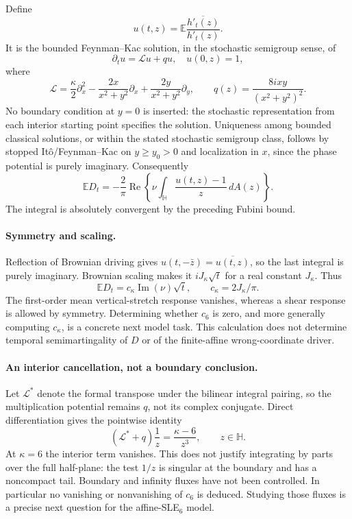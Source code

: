\documentclass[11pt]{article}
\theoremstyle{definition}\newtheorem{definition}[theorem]{Definition}
\theoremstyle{remark}\newtheorem{remark}[theorem]{Remark}
\begin{document}
Define
\[
 u(t,z)=\mathbb E\frac{\overline{h'_t(z)}}{h'_t(z)}.
\]
It is the bounded Feynman--Kac solution, in the stochastic semigroup
sense, of
\[
 \partial_tu=\mathcal Lu+qu,\quad u(0,z)=1,
\]
where
\[
 \mathcal L=\frac\kappa2\partial_x^2-
       \frac{2x}{x^2+y^2}\partial_x+
       \frac{2y}{x^2+y^2}\partial_y,
 \qquad q(z)=\frac{8ixy}{(x^2+y^2)^2}.
\]
No boundary condition at $y=0$ is inserted: the stochastic representation
from each interior starting point specifies the solution. Uniqueness among bounded classical solutions, or within the stated
stochastic semigroup class, follows by stopped It\^o/Feynman--Kac on $y\ge y_0>0$ and
localization in $x$, since the phase potential is purely imaginary.
Consequently
\[
 \mathbb ED_t=-\frac2\pi\operatorname{Re}
 \left\{\nu\int_{\mathbb H}\frac{u(t,z)-1}{z}\,dA(z)\right\}.
\]
The integral is absolutely convergent by the preceding Fubini bound.

\paragraph{Symmetry and scaling.}
Reflection of Brownian driving gives
$u(t,-\bar z)=\overline{u(t,z)}$, so the last integral is purely
imaginary. Brownian scaling makes it $iJ_\kappa\sqrt t$ for a real
constant $J_\kappa$. Thus
\[
 \mathbb ED_t=c_\kappa\operatorname{Im}(\nu)\sqrt t,
 \qquad c_\kappa=2J_\kappa/\pi.
\]
The first-order mean vertical-stretch response vanishes, whereas a shear
response is allowed by symmetry. Determining whether $c_6$ is zero,
and more generally computing $c_\kappa$, is a concrete next model task.
This calculation does not determine temporal semimartingality of $D$
or of the finite-affine wrong-coordinate driver.

\paragraph{An interior cancellation, not a boundary conclusion.}
Let $\mathcal L^*$ denote the formal transpose under the bilinear
integral pairing, so the multiplication potential remains $q$, not
its complex conjugate. Direct differentiation gives the pointwise identity
\[
 (\mathcal L^*+q)\frac1z=\frac{\kappa-6}{z^3},\qquad z\in\mathbb H.
\]
At $\kappa=6$ the interior term vanishes. This does not justify
integrating by parts over the full half-plane: the test $1/z$ is
singular at the boundary and has a noncompact tail. Boundary and
infinity fluxes have not been controlled. In particular no vanishing
or nonvanishing of $c_6$ is deduced. Studying those fluxes is a precise
next question for the affine-SLE$_6$ model.
\end{document}

